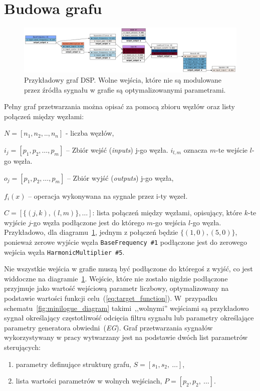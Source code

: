 \section{Budowa grafu}

\begin{figure}[H]\label{fig:example_graph_definition_chapter}
    \centering
    \includegraphics[width=0.9\linewidth]{rys05/luthier_simple_analog.png}
    \caption{
      Przykładowy graf DSP\@. Wolne wejścia, które nie są modulowane przez
      źródła sygnału w grafie są optymalizowanymi parametrami.
    }
\end{figure}


Pełny graf przetwarzania można opisać za pomocą zbioru węzłów oraz
listy połączeń między węzłami:

$N = [n_1, n_2, .., n_n]$ - liczba węzłów,

$i_{j} = [ p_1, p_2, \ldots, p_m ]$ -- Zbiór wejść (\textit{inputs}) j-go węzła. $i_{l, m}$ oznacza $m$-te wejście $l$-go węzła.

$o_{j} = [ p_1, p_2, \ldots, p_m ]$ -- Zbiór wyjść (\textit{outputs}) j-go węzła,

$f_i(x)$ -- operacja wykonywana na sygnale przez i-ty węzeł. %

$C = [ \{ (j, k), (l, m) \}, \ldots ] $: lista połączeń między węzłami, opisujący, które 
$k$-te wyjście $j$-go węzła podłączone jest do którego $m$-go wejścia $l$-go węzła. Przykładowo,
dla diagramu~\ref{fig:example_graph_definition_chapter}, jednym z połączeń będzie $\{(1, 0), (5, 0)\}$,
ponieważ zerowe wyjście węzła \texttt{BaseFrequency~\#1} podłączone jest do zerowego
wejścia węzła \texttt{HarmonicMultiplier~\#5}.

Nie wszystkie wejścia w grafie muszą być podłączone do któregoś z wyjść, 
co jest widdoczne na diagramie~\ref{fig:example_graph_definition_chapter}.
Wejście, które nie zostało nigdzie podłączone przyjmuje jako wartość wejściową parametr 
liczbowy, optymalizowany na podstawie wartości funkcji celu~(\ref{eq:target_function}).
W~przypadku schematu~\ref{fig:minilogue_diagram} takimi~,,wolnymi'' wejściami są przykładowo
sygnał określający częstotliwość odcięcia filtru sygnału lub parametry określające parametry
generatora obwiedni~(\textit{EG}).
Graf przetwarzania sygnałów wykorzystywany w pracy wytwarzany
jest na podstawie dwóch list parametrów sterujących:
\begin{enumerate}
  \item parametry definujące strukturę grafu, $S = [s_1, s_2,~\ldots]$,
  \item lista wartości parametrów w wolnych wejściach, $P = [p_2, p_2,~\ldots]$.
\end{enumerate}


